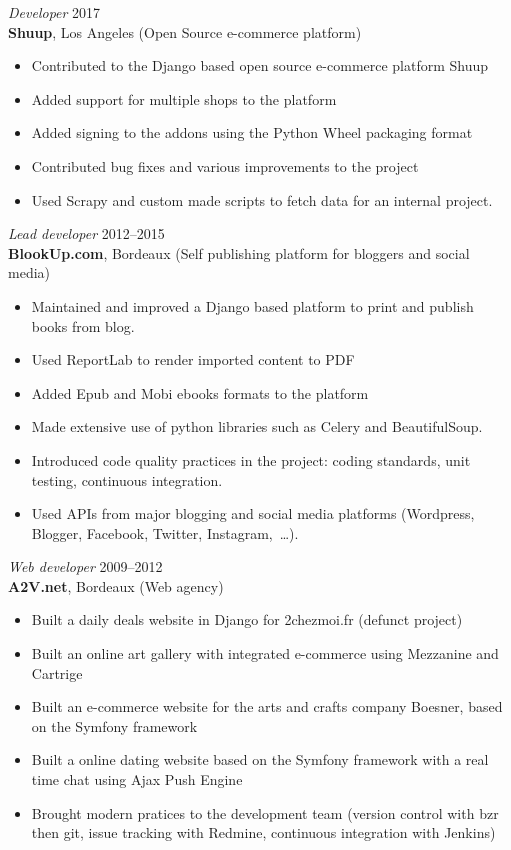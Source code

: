 \documentclass[line,resmargin]{res}
\begin{document}
\begin{resume}
{\sl Developer\/} \hfill 2017\\
{\bf Shuup}, Los Angeles (Open Source e-commerce platform)
\begin{itemize} \itemsep -2pt
    \item Contributed to the Django based open source e-commerce platform Shuup
    \item Added support for multiple shops to the platform
    \item Added signing to the addons using the Python Wheel packaging format
    \item Contributed bug fixes and various improvements to the project
    \item Used Scrapy and custom made scripts to fetch data for an internal project.
\end{itemize}

{\sl Lead developer\/} \hfill 2012--2015\\
{\bf BlookUp.com}, Bordeaux (Self publishing platform for bloggers and social media)
\begin{itemize} \itemsep -2pt
    \item Maintained and improved a Django based platform to print and publish books from blog.
    \item Used ReportLab to render imported content to PDF
    \item Added Epub and Mobi ebooks formats to the platform
    \item Made extensive use of python libraries such as Celery and BeautifulSoup.
    \item Introduced code quality practices in the project: coding standards, unit testing, continuous integration.
    \item Used APIs from major blogging and social media platforms (Wordpress, Blogger, Facebook, Twitter, Instagram, …).
\end{itemize}

{\sl Web developer\/} \hfill 2009--2012 \\
{\bf A2V.net}, Bordeaux (Web agency)
\begin{itemize}  \itemsep -2pt
    \item Built a daily deals website in Django for 2chezmoi.fr (defunct project)
    \item Built an online art gallery with integrated e-commerce using Mezzanine and Cartrige
    \item Built an e-commerce website for the arts and crafts company Boesner, based on the Symfony framework
    \item Built a online dating website based on the Symfony framework with a real time chat using Ajax Push Engine
    \item Brought modern pratices to the development team (version control with bzr then git,
        issue tracking with Redmine, continuous integration with Jenkins)
\end{itemize}


\end{resume}
\end{document}

